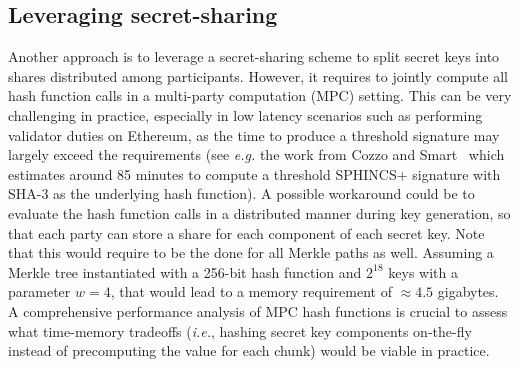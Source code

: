 \subsection{Leveraging secret-sharing}
Another approach is to leverage a secret-sharing scheme to split \WOTS secret keys into shares distributed among participants.
However, it requires to jointly compute all hash function calls in a multi-party computation (MPC) setting.
This can be very challenging in practice, especially in low latency scenarios such as performing validator duties on Ethereum, as the time to produce a threshold signature may largely exceed the requirements (see \textit{e.g.} the work from Cozzo and Smart~\cite{sharing_luov19} which estimates around 85 minutes to compute a threshold \textsf{SPHINCS+} signature with \textsf{SHA-3} as the underlying hash function).
A possible workaround could be to evaluate the hash function calls in a distributed manner during key generation, so that each party can store a share for each component of each \WOTS secret key.
Note that this would require to be the done for all Merkle paths as well.
Assuming a Merkle tree instantiated with a 256-bit hash function and $2^{18}$ \WOTS keys with a parameter $w = 4$, that would lead to a memory requirement of $\approx 4.5$ gigabytes.
A comprehensive performance analysis of MPC hash functions is crucial to assess what time-memory tradeoffs (\textit{i.e.}, hashing \WOTS secret key components on-the-fly instead of precomputing the value for each chunk) would be viable in practice.

%



 
